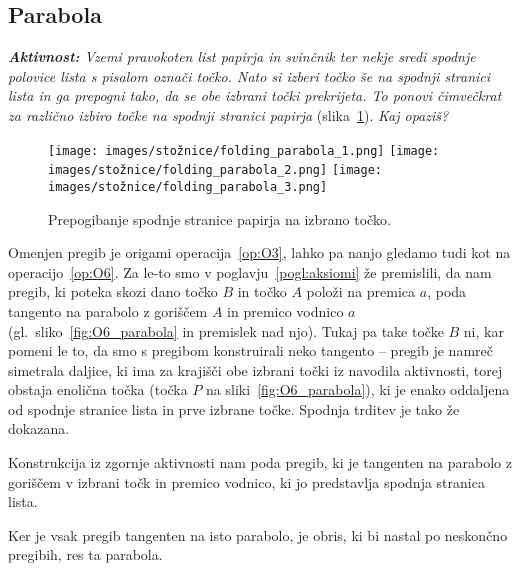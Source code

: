 \subsection{Parabola}

\textit{\textbf{Aktivnost:} Vzemi pravokoten list papirja in svinčnik ter nekje sredi spodnje polovice lista s pisalom označi točko. Nato si izberi točko še na spodnji stranici lista in ga prepogni tako, da se obe izbrani točki prekrijeta. To ponovi čimvečkrat za različno izbiro točke na spodnji stranici papirja} (slika~\ref{fig:koraki_parabola}). \textit{Kaj opaziš?}

\begin{figure}[h]
    \centering
    \texttt{[image: images/stožnice/folding\_parabola\_1.png]}
    \texttt{[image: images/stožnice/folding\_parabola\_2.png]}
    \texttt{[image: images/stožnice/folding\_parabola\_3.png]}
    \caption[Prepogibanje parabole]{Prepogibanje spodnje stranice papirja na izbrano točko.}
    \label{fig:koraki_parabola}
\end{figure}


Omenjen pregib je origami operacija~\ref{op:O3}, lahko pa nanjo gledamo tudi kot na operacijo~\ref{op:O6}. Za le-to smo v poglavju~\ref{pogl:aksiomi} že premislili, da nam pregib, ki poteka skozi dano točko $B$ in točko $A$ položi na premica $a$, poda tangento na parabolo z goriščem $A$ in premico vodnico $a$ (gl.\ sliko~\ref{fig:O6_parabola} in premislek nad njo). Tukaj pa take točke $B$ ni, kar pomeni le to, da smo s pregibom konstruirali neko tangento -- pregib je namreč simetrala daljice, ki ima za krajišči obe izbrani točki iz navodila aktivnosti, torej obstaja enolična točka (točka $P$ na sliki~\ref{fig:O6_parabola}), ki je enako oddaljena od spodnje stranice lista in prve izbrane točke. Spodnja trditev je tako že dokazana.

\begin{trditev}
    Konstrukcija iz zgornje aktivnosti nam poda pregib, ki je tangenten na parabolo z goriščem v izbrani točk in premico vodnico, ki jo predstavlja spodnja stranica lista.
\end{trditev}

Ker je vsak pregib tangenten na isto parabolo, je obris, ki bi nastal po neskončno pregibih, res ta parabola.

